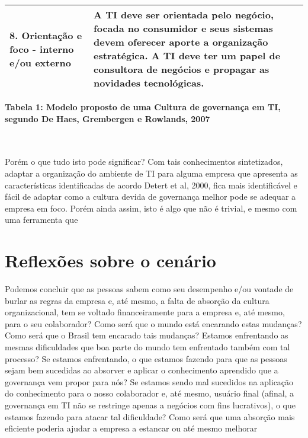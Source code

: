 \begin{center}
\begin{tabular}{|p{5cm}|p{11cm}|}
        8. Orientação e foco - interno e/ou externo & A TI deve ser orientada pelo negócio, focada no consumidor e seus sistemas devem oferecer aporte a organização estratégica. A TI deve ter um papel de consultora de negócios e propagar as novidades tecnológicas. \\
        \hline
    \end{tabular}

\end{center}
\caption {{\bf Tabela 1: Modelo proposto de uma Cultura de governança em TI, segundo De Haes, Grembergen e Rowlands, 2007\cite{exploringit}}}

\\~\\

Porém o que tudo isto pode significar? Com tais conhecimentos sintetizados, adaptar a organização do ambiente de TI para alguma empresa que apresenta as características identificadas de acordo Detert et al, 2000, fica mais identificável e fácil de adaptar como a cultura devida de governança melhor pode se adequar a empresa em foco. Porém ainda assim, isto é algo que não é trivial, e mesmo com uma ferramenta que 

\section{Reflexões sobre o cenário}

Podemos concluir que as pessoas sabem como seu desempenho e/ou vontade de burlar as regras da empresa e, até mesmo, a falta de absorção da cultura organizacional, tem se voltado financeiramente para a empresa e, até mesmo, para o seu colaborador? Como será que o mundo está encarando estas mudanças? Como será que o Brasil tem encarado tais mudanças? Estamos enfrentando as mesmas dificuldades que boa parte do mundo tem enfrentado também com tal processo? Se estamos enfrentando, o que estamos fazendo para que as pessoas sejam bem sucedidas ao absorver e aplicar o conhecimento aprendido que a governança vem propor para nós? Se estamos sendo mal sucedidos na aplicação do conhecimento para o nosso colaborador e, até mesmo, usuário final (afinal, a governança em TI não se restringe apenas a negócios com fins lucrativos), o que estamos fazendo para atacar tal dificuldade? Como será que uma absorção mais eficiente poderia ajudar a empresa a estancar ou até mesmo melhorar